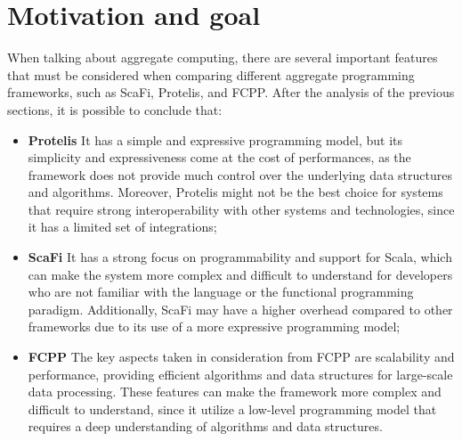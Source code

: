 \section{Motivation and goal}\label{section:motivation_goal}
When talking about aggregate computing, there are several important features that must be considered when comparing different aggregate programming frameworks, such as ScaFi, Protelis, and FCPP.\newline
After the analysis of the previous sections, it is possible to conclude that:
\begin{itemize}
    \item \textbf{Protelis}\newline
    It has a simple and expressive programming model, but its simplicity and expressiveness come at the cost of performances, as the framework does not provide much control over the underlying data structures and algorithms. Moreover, Protelis might not be the best choice for systems that require strong interoperability with other systems and technologies, since it has a limited set of integrations;
    \item \textbf{ScaFi}\newline
    It has a strong focus on programmability and support for Scala, which can make the system more complex and difficult to understand for developers who are not familiar with the language or the functional programming paradigm. Additionally, ScaFi may have a higher overhead compared to other frameworks due to its use of a more expressive programming model;
    \item \textbf{FCPP}\newline
    The key aspects taken in consideration from FCPP are scalability and performance, providing efficient algorithms and data structures for large-scale data processing. These features can make the framework more complex and difficult to understand, since it utilize a low-level programming model that requires a deep understanding of algorithms and data structures.
\end{itemize}

